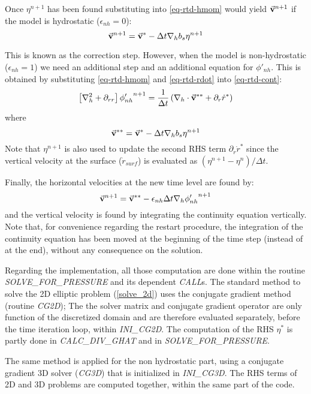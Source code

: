 Once ${\eta}^{n+1}$ has been found substituting into \ref{eq-rtd-hmom}
would yield $\vec{\bf v}^{n+1}$ if the model is hydrostatic
($\epsilon_{nh}=0$):
$$
\vec{\bf v}^{n+1} = \vec{\bf v}^{*}
- \Delta t {\bf \nabla}_h b_s {\eta}^{n+1}
$$

This is known as the correction step. However, when the model is
non-hydrostatic ($\epsilon_{nh}=1$) we need an additional step and an
additional equation for $\phi'_{nh}$. This is obtained by
substituting \ref{eq-rtd-hmom} and \ref{eq-rtd-rdot} into
\ref{eq-rtd-cont}:
\begin{equation}
\left[ {\bf \nabla}_h^2 + \partial_{rr} \right] {\phi'_{nh}}^{n+1}
= \frac{1}{\Delta t} \left(
{\bf \nabla}_h \cdot \vec{\bf v}^{**} + \partial_r \dot{r}^* \right)
\end{equation}
where
\begin{displaymath}
\vec{\bf v}^{**} = \vec{\bf v}^* - \Delta t {\bf \nabla}_h b_s {\eta}^{n+1}
\end{displaymath}
Note that $\eta^{n+1}$ is also used to update the second RHS term
$\partial_r \dot{r}^* $ since
the vertical velocity at the surface ($\dot{r}_{surf}$) 
is evaluated as $(\eta^{n+1} - \eta^n) / \Delta t$.

Finally, the horizontal velocities at the new time level are found by:
\begin{equation}
\vec{\bf v}^{n+1} = \vec{\bf v}^{**}
- \epsilon_{nh} \Delta t {\bf \nabla}_h {\phi'_{nh}}^{n+1}
\end{equation}
and the vertical velocity is found by integrating the continuity
equation vertically.
Note that, for convenience regarding the restart procedure,
the integration of the continuity equation has been 
moved at the beginning of the time step (instead of at the end),
without any consequence on the solution.

Regarding the implementation, all those computation are done
within the routine {\it SOLVE\_FOR\_PRESSURE} and its dependent 
{\it CALL}s.
The standard method to solve the 2D elliptic problem (\ref{solve_2d})
uses the conjugate gradient method (routine {\it CG2D}); The 
the solver matrix and conjugate gradient operator are only function
of the discretized domain and are therefore evaluated separately,
before the time iteration loop, within {\it INI\_CG2D}. 
The computation of the RHS $\eta^*$ is partly 
done in {\it CALC\_DIV\_GHAT} and in {\it SOLVE\_FOR\_PRESSURE}.

The same method is applied for the non hydrostatic part, using
a conjugate gradient 3D solver ({\it CG3D}) that is initialized 
in {\it INI\_CG3D}. The RHS terms of 2D and 3D problems 
are computed together, within the same part of the code.

